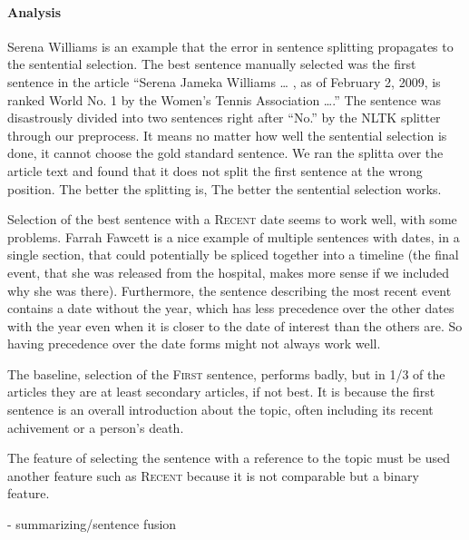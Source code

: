 \documentclass[11pt]{article}
\newcommand{\war}[1]{{\sf\small #1}}
\begin{document}
\paragraph {Analysis}

\war{Serena Williams} is an example that the error in sentence splitting
propagates to the sentential selection. The best sentence manually selected
was the first sentence in the article ``Serena Jameka Williams \ldots
, as of February 2, 2009, is ranked World No. 1 by the Women's Tennis
Association \dots .'' The sentence was disastrously divided into two sentences
right after ``No.'' by the NLTK splitter through our preprocess.
It means no matter how well the sentential selection is done,
it cannot choose the gold standard sentence. We ran the splitta
\cite{dgillick09sbd} over the article text and found that it does not
split the first sentence at the wrong position. The better the splitting is,
The better the sentential selection works.

Selection of the best sentence with a \textsc{Recent} date seems to work well,
with some problems.  \war{Farrah Fawcett} is a nice example of multiple sentences
with dates, in a single section, that could potentially be spliced
together into a timeline (the final event, that she was released from
the hospital, makes more sense if we included why she was there).
Furthermore, the sentence describing the most recent event contains
a date without the year, which has less precedence over the other dates with the year
even when it is closer to the date of interest than the others are.
So having precedence over the date forms might not always work well.

The baseline, selection of the \textsc{First} sentence, performs badly,
but in 1/3 of the articles they are at least secondary articles, if not best.
It is because the first sentence is an overall introduction about the topic,
often including its recent achivement or a person's death.

The feature of selecting the sentence with a reference to the topic
must be used another feature such as \textsc{Recent} because
it is not comparable but a binary feature.

- summarizing/sentence fusion
\end{document}

